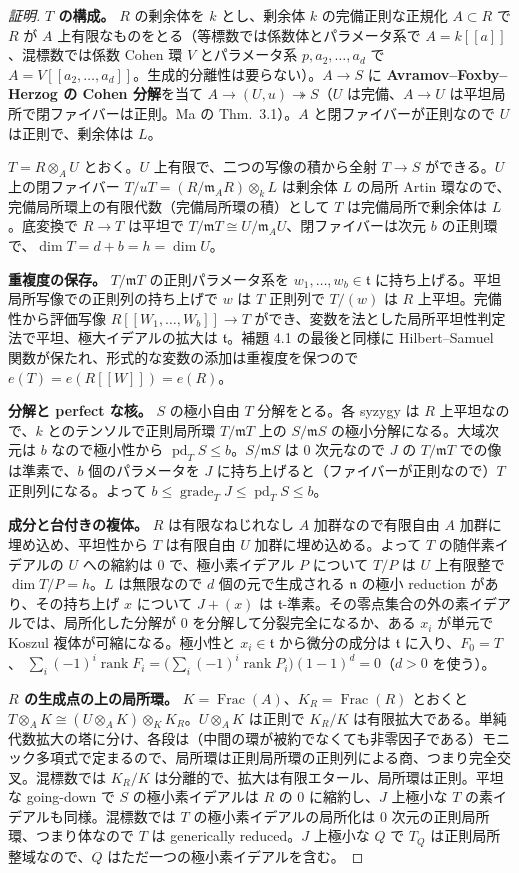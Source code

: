 \documentclass[11pt,a4paper]{ltjsarticle}
\theoremstyle{plain}
\theoremstyle{definition}
\newcommand{\m}{\mathfrak{m}}
\newcommand{\n}{\mathfrak{n}}
\newcommand{\tf}{\mathfrak{t}}
\newcommand{\rank}{\operatorname{rank}}
\newcommand{\Frac}{\operatorname{Frac}}
\newcommand{\pd}{\operatorname{pd}}
\newcommand{\grade}{\operatorname{grade}}
\begin{document}
\begin{proof}[証明]
\textbf{$T$ の構成。} $R$ の剰余体を $k$ とし、剰余体 $k$ の完備正則な正規化 $A\subset R$ で $R$ が $A$ 上有限なものをとる（等標数では係数体とパラメータ系で $A = k[[a]]$、混標数では係数 Cohen 環 $V$ とパラメータ系 $p,a_2,\dots,a_d$ で $A = V[[a_2,\dots,a_d]]$。生成的分離性は要らない）。$A\to S$ に \textbf{Avramov--Foxby--Herzog の Cohen 分解}を当て $A\to(U,u)\twoheadrightarrow S$（$U$ は完備、$A\to U$ は平坦局所で閉ファイバーは正則。Ma の Thm.~3.1）。$A$ と閉ファイバーが正則なので $U$ は正則で、剰余体は $L$。

$T = R\otimes_AU$ とおく。$U$ 上有限で、二つの写像の積から全射 $T\to S$ ができる。$U$ 上の閉ファイバー $T/uT = (R/\m_AR)\otimes_kL$ は剰余体 $L$ の局所 Artin 環なので、完備局所環上の有限代数（完備局所環の積）として $T$ は完備局所で剰余体は $L$。底変換で $R\to T$ は平坦で $T/\m T\cong U/\m_AU$、閉ファイバーは次元 $b$ の正則環で、$\dim T = d+b = h = \dim U$。

\textbf{重複度の保存。} $T/\m T$ の正則パラメータ系を $w_1,\dots,w_b\in\tf$ に持ち上げる。平坦局所写像での正則列の持ち上げで $w$ は $T$ 正則列で $T/(w)$ は $R$ 上平坦。完備性から評価写像 $R[[W_1,\dots,W_b]]\to T$ ができ、変数を法とした局所平坦性判定法で平坦、極大イデアルの拡大は $\tf$。補題 4.1 の最後と同様に Hilbert--Samuel 関数が保たれ、形式的な変数の添加は重複度を保つので $e(T) = e(R[[W]]) = e(R)$。

\textbf{分解と perfect な核。} $S$ の極小自由 $T$ 分解をとる。各 syzygy は $R$ 上平坦なので、$k$ とのテンソルで正則局所環 $T/\m T$ 上の $S/\m S$ の極小分解になる。大域次元は $b$ なので極小性から $\pd_TS\le b$。$S/\m S$ は $0$ 次元なので $J$ の $T/\m T$ での像は準素で、$b$ 個のパラメータを $J$ に持ち上げると（ファイバーが正則なので）$T$ 正則列になる。よって $b\le\grade_TJ\le\pd_TS\le b$。

\textbf{成分と台付きの複体。} $R$ は有限なねじれなし $A$ 加群なので有限自由 $A$ 加群に埋め込め、平坦性から $T$ は有限自由 $U$ 加群に埋め込める。よって $T$ の随伴素イデアルの $U$ への縮約は $0$ で、極小素イデアル $P$ について $T/P$ は $U$ 上有限整で $\dim T/P = h$。$L$ は無限なので $d$ 個の元で生成される $\n$ の極小 reduction があり、その持ち上げ $x$ について $J+(x)$ は $\tf$-準素。その零点集合の外の素イデアルでは、局所化した分解が $0$ を分解して分裂完全になるか、ある $x_i$ が単元で Koszul 複体が可縮になる。極小性と $x_i\in\tf$ から微分の成分は $\tf$ に入り、$F_0 = T$、
$\sum_i(-1)^i\rank F_i = \bigl(\sum_i(-1)^i\rank P_i\bigr)(1-1)^d = 0$（$d>0$ を使う）。

\textbf{$R$ の生成点の上の局所環。} $K = \Frac(A)$、$K_R = \Frac(R)$ とおくと $T\otimes_AK\cong(U\otimes_AK)\otimes_KK_R$。$U\otimes_AK$ は正則で $K_R/K$ は有限拡大である。単純代数拡大の塔に分け、各段は（中間の環が被約でなくても非零因子である）モニック多項式で定まるので、局所環は正則局所環の正則列による商、つまり完全交叉。混標数では $K_R/K$ は分離的で、拡大は有限エタール、局所環は正則。平坦な going-down で $S$ の極小素イデアルは $R$ の $0$ に縮約し、$J$ 上極小な $T$ の素イデアルも同様。混標数では $T$ の極小素イデアルの局所化は $0$ 次元の正則局所環、つまり体なので $T$ は generically reduced。$J$ 上極小な $Q$ で $T_Q$ は正則局所整域なので、$Q$ はただ一つの極小素イデアルを含む。
\end{proof}
\end{document}
